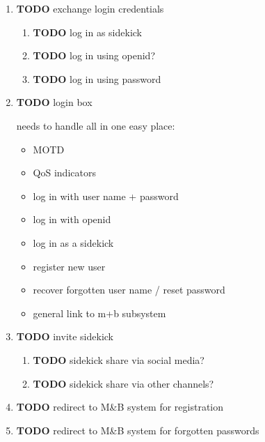 \documentclass[11pt]{article}
\begin{document}
\begin{enumerate}
\begin{enumerate}
\begin{enumerate}
\begin{enumerate}
\begin{enumerate}
\item {\bfseries\sffamily TODO} exchange login credentials
\label{sec-5-4-1-4-2-5-2}

\begin{enumerate}
\item {\bfseries\sffamily TODO} log in as sidekick
\label{sec-5-4-1-4-2-5-2-1}

\item {\bfseries\sffamily TODO} log in using openid?
\label{sec-5-4-1-4-2-5-2-2}

\item {\bfseries\sffamily TODO} log in using password
\label{sec-5-4-1-4-2-5-2-3}
\end{enumerate}

\item {\bfseries\sffamily TODO} login box
\label{sec-5-4-1-4-2-5-3}

needs to handle all in one easy place:

\begin{itemize}
\item MOTD
\item QoS indicators
\item log in with user name + password
\item log in with openid
\item log in as a sidekick
\item register new user
\item recover forgotten user name / reset password
\item general link to m+b subsystem
\end{itemize}
\item {\bfseries\sffamily TODO} invite sidekick
\label{sec-5-4-1-4-2-5-4}

\begin{enumerate}
\item {\bfseries\sffamily TODO} sidekick share via social media?
\label{sec-5-4-1-4-2-5-4-1}

\item {\bfseries\sffamily TODO} sidekick share via other channels?
\label{sec-5-4-1-4-2-5-4-2}
\end{enumerate}
\item {\bfseries\sffamily TODO} redirect to M\&B system for registration
\label{sec-5-4-1-4-2-5-5}

\item {\bfseries\sffamily TODO} redirect to M\&B system for forgotten passwords
\label{sec-5-4-1-4-2-5-6}


\end{enumerate}
\end{enumerate}
\end{enumerate}
\end{enumerate}
\end{enumerate}
\end{document}

